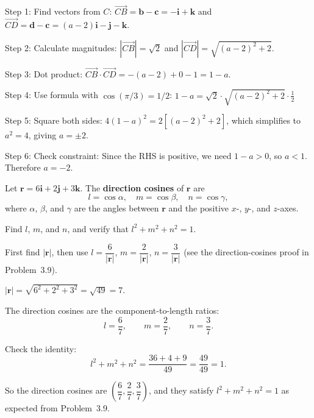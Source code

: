 \begin{solution}[Sketch]
Step 1: Find vectors from $C$: 
$\overrightarrow{CB} = \mathbf{b} - \mathbf{c} = -\mathbf{i} + \mathbf{k}$ and $\overrightarrow{CD} = \mathbf{d} - \mathbf{c} = (a-2)\mathbf{i} - \mathbf{j} - \mathbf{k}$.

Step 2: Calculate magnitudes: 
$|\overrightarrow{CB}| = \sqrt{2}$ and $|\overrightarrow{CD}| = \sqrt{(a-2)^2 + 2}$.

Step 3: Dot product: 
$\overrightarrow{CB} \cdot \overrightarrow{CD} = -(a-2) + 0 - 1 = 1 - a$.

Step 4: Use formula with $\cos(\pi/3) = 1/2$:
$1 - a = \sqrt{2} \cdot \sqrt{(a-2)^2 + 2} \cdot \frac{1}{2}$

Step 5: Square both sides: 
$4(1-a)^2 = 2[(a-2)^2 + 2]$, which simplifies to $a^2 = 4$, giving $a = \pm 2$.

Step 6: Check constraint: Since the RHS is positive, we need $1-a > 0$, so $a < 1$. Therefore $a = -2$.
\end{solution}

\vspace{1em}

\begin{problem}
Let $\mathbf{r} = 6\mathbf{i} + 2\mathbf{j} + 3\mathbf{k}$. The \textbf{direction cosines} of $\mathbf{r}$ are
\[
l = \cos\alpha, \quad m = \cos\beta, \quad n = \cos\gamma,
\]
where $\alpha$, $\beta$, and $\gamma$ are the angles between $\mathbf{r}$ and the positive $x$-, $y$-, and $z$-axes.

Find $l$, $m$, and $n$, and verify that $l^2 + m^2 + n^2 = 1$.
\end{problem}

\begin{hint}
First find $|\mathbf{r}|$, then use $l = \dfrac{6}{|\mathbf{r}|}$, $m = \dfrac{2}{|\mathbf{r}|}$, $n = \dfrac{3}{|\mathbf{r}|}$ (see the direction-cosines proof in Problem~3.9).
\end{hint}

\begin{solution}[Sketch]
$|\mathbf{r}| = \sqrt{6^2 + 2^2 + 3^2} = \sqrt{49} = 7$.

The direction cosines are the component-to-length ratios:
\[
l = \frac{6}{7}, \qquad m = \frac{2}{7}, \qquad n = \frac{3}{7}.
\]

Check the identity:
\[
l^2 + m^2 + n^2
= \frac{36 + 4 + 9}{49}
= \frac{49}{49}
= 1.
\]

So the direction cosines are $\left(\dfrac{6}{7}, \dfrac{2}{7}, \dfrac{3}{7}\right)$, and they satisfy $l^2 + m^2 + n^2 = 1$ as expected from Problem~3.9.
\end{solution}

